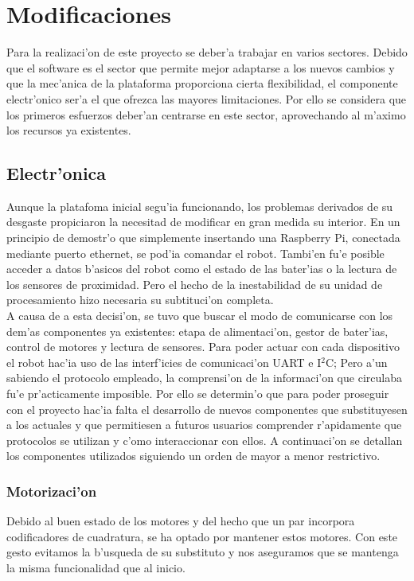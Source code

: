 \documentclass[twoside,12pt]{article}
\begin{document}
\newpage
\section{Modificaciones}
Para la realizaci'on de este proyecto se deber'a trabajar en varios sectores. Debido que el software es el sector que permite mejor adaptarse a los nuevos cambios y que la mec'anica de la plataforma proporciona cierta flexibilidad, el componente electr'onico ser'a el que ofrezca las mayores limitaciones. Por ello se considera que los primeros esfuerzos deber'an centrarse en este sector, aprovechando al m'aximo los recursos ya existentes.

\subsection{Electr'onica}
Aunque la platafoma inicial segu'ia funcionando, los problemas derivados de su desgaste propiciaron la necesitad de modificar en gran medida su interior. En un principio de demostr'o que simplemente insertando una Raspberry Pi, conectada mediante puerto ethernet, se pod'ia comandar el robot. Tambi'en fu'e posible acceder a datos b'asicos del robot como el estado de las bater'ias o la lectura de los sensores de proximidad. Pero el hecho de la inestabilidad de su unidad de procesamiento hizo necesaria su subtituci'on completa.\\

A causa de a esta decisi'on, se tuvo que buscar el modo de comunicarse con los dem'as componentes ya existentes: etapa de alimentaci'on, gestor de bater'ias, control de motores y lectura de sensores. Para poder actuar con cada dispositivo el robot hac'ia uso de las interf'icies de comunicaci'on UART e I$^{2}$C; Pero a'un sabiendo el protocolo empleado, la comprensi'on de la informaci'on que circulaba fu'e pr'acticamente imposible. Por ello se determin'o que para poder proseguir con el proyecto hac'ia falta el desarrollo de nuevos componentes que substituyesen a los actuales y que permitiesen a futuros usuarios comprender r'apidamente que protocolos se utilizan y c'omo interaccionar con ellos. A continuaci'on se detallan los componentes utilizados siguiendo un orden de mayor a menor restrictivo.

\subsubsection{Motorizaci'on}
Debido al buen estado de los motores y del hecho que un par incorpora codificadores de cuadratura, se ha optado por mantener estos motores. Con este gesto evitamos la b'usqueda de su substituto y nos aseguramos que se mantenga la misma funcionalidad que al inicio. \\
\end{document}
